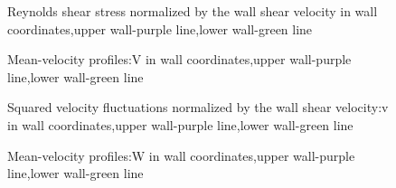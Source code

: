\begin{figure}[H]
\centering
 \caption{Reynolds shear stress normalized by the wall shear velocity in wall coordinates,upper wall-purple line,lower wall-green line}
\label{pd}
\end{figure}

\begin{figure}[H]
\centering
 \caption{Mean-velocity profiles:V in wall coordinates,upper wall-purple line,lower wall-green line}
\label{pd}
\end{figure}


\begin{figure}[H]
\centering
 \caption{Squared velocity fluctuations normalized by the wall shear velocity:v in wall coordinates,upper wall-purple line,lower wall-green line}
\label{pd}
\end{figure}

\begin{figure}[H]
\centering
 \caption{Mean-velocity profiles:W in wall coordinates,upper wall-purple line,lower wall-green line}
\label{pd}
\end{figure}

